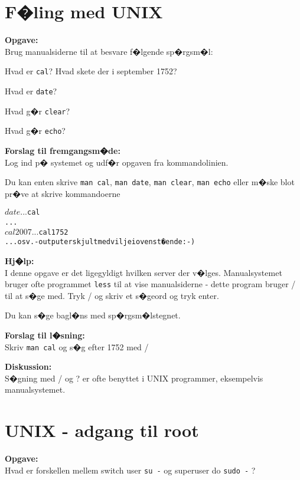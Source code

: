 \documentclass[a4paper,11pt,notitlepage]{oevelser}
\begin{document}
\chapter{F�ling med UNIX}
\label{ex:unix-cal}

{\bfseries Opgave:}\\
Brug manualsiderne til at besvare f�lgende sp�rgsm�l:

\begin{list2}
\item Hvad er \verb+cal+? Hvad skete der i september 1752?
\item Hvad er \verb+date+?
\item Hvad g�r \verb+clear+?
\item Hvad g�r \verb+echo+?
\end{list2}

{\bfseries Forslag til fremgangsm�de:}\\
Log ind p� systemet og udf�r opgaven fra kommandolinien.

Du kan enten skrive \verb+man cal+, \verb+man date+, \verb+man clear+,
\verb+man echo+ eller m�ske blot pr�ve at skrive kommandoerne

\begin{alltt}
$ date
...
$ cal
...
$ cal 2007
...
$ cal 1752
... osv. - output er skjult med vilje i ovenst�ende :-)
\end{alltt}

{\bfseries Hj�lp:}\\
I denne opgave er det ligegyldigt hvilken server der v�lges.
Manualsystemet bruger ofte programmet \verb+less+ til at vise manualsiderne
- dette program bruger / til at s�ge med. Tryk / og skriv et s�geord
og tryk enter.

Du kan s�ge bagl�ns med sp�rgsm�lstegnet.

{\bfseries Forslag til l�sning:}\\
Skriv \verb+man cal+ og s�g efter 1752 med /

{\bfseries Diskussion:}\\
S�gning med / og ? er ofte benyttet i UNIX programmer, eksempelvis
manualsystemet.

\chapter{UNIX - adgang til root}
\label{ex:sudo}

{\bfseries Opgave:}\\
Hvad er forskellen mellem switch user \verb+su -+ og superuser do
\verb+sudo -+ ?
\end{document}

